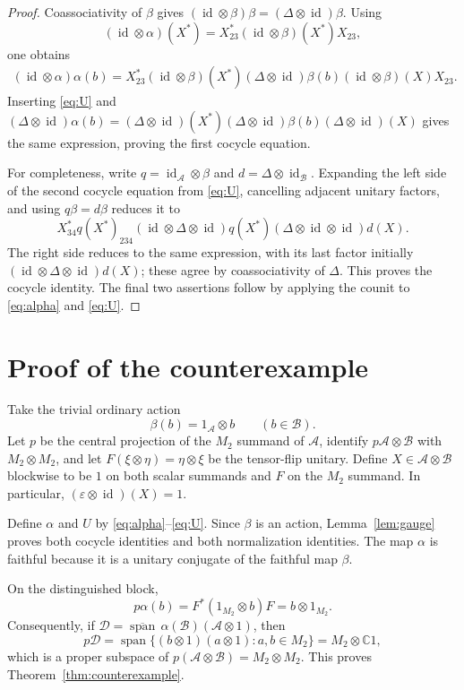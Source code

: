 \documentclass[11pt]{article}
\newcommand{\A}{\mathcal A}
\newcommand{\B}{\mathcal B}
\newcommand{\id}{\operatorname{id}}
\newcommand{\spn}{\operatorname{span}}
\begin{document}
\begin{proof}
Coassociativity of $\beta$ gives
$(\id\otimes\beta)\beta=(\Delta\otimes\id)\beta$.  Using
\[
 (\id\otimes\alpha)(X^*)
  =X_{23}^*(\id\otimes\beta)(X^*)X_{23},
\]
one obtains
\begin{align*}
 (\id\otimes\alpha)\alpha(b)
  =X_{23}^*(\id\otimes\beta)(X^*)
   (\Delta\otimes\id)\beta(b)
   (\id\otimes\beta)(X)X_{23}.
\end{align*}
Inserting \eqref{eq:U} and
$(\Delta\otimes\id)\alpha(b)
=(\Delta\otimes\id)(X^*)(\Delta\otimes\id)\beta(b)
(\Delta\otimes\id)(X)$ gives the same expression, proving the first
cocycle equation.

For completeness, write $q=\id_{\A}\otimes\beta$ and
$d=\Delta\otimes\id_{\B}$.  Expanding the left side of the second cocycle
equation from \eqref{eq:U}, cancelling adjacent unitary factors, and using
$q\beta=d\beta$ reduces it to
\[
 X_{34}^*q(X^*)_{234}
 (\id\otimes\Delta\otimes\id)q(X^*)
 (\Delta\otimes\id\otimes\id)d(X).
\]
The right side reduces to the same expression, with its last factor initially
$(\id\otimes\Delta\otimes\id)d(X)$; these agree by coassociativity of
$\Delta$.  This proves the cocycle identity.  The final two assertions follow
by applying the counit to \eqref{eq:alpha} and \eqref{eq:U}.
\end{proof}

\section{Proof of the counterexample}

Take the trivial ordinary action
\[
 \beta(b)=1_{\A}\otimes b \qquad(b\in\B).
\]
Let $p$ be the central projection of the $M_2$ summand of $\A$, identify
$p\A\otimes\B$ with $M_2\otimes M_2$, and let
$F(\xi\otimes\eta)=\eta\otimes\xi$ be the tensor-flip unitary.  Define
$X\in\A\otimes\B$ blockwise to be $1$ on both scalar summands and $F$ on
the $M_2$ summand.  In particular,
$(\varepsilon\otimes\id)(X)=1$.

Define $\alpha$ and $U$ by \eqref{eq:alpha}--\eqref{eq:U}.  Since $\beta$
is an action, Lemma~\ref{lem:gauge} proves both cocycle identities and both
normalization identities.  The map $\alpha$ is faithful because it is a
unitary conjugate of the faithful map $\beta$.

On the distinguished block,
\[
 p\alpha(b)=F^*(1_{M_2}\otimes b)F=b\otimes1_{M_2}.
\]
Consequently, if
$\mathcal D=\overline{\spn}\,\alpha(\B)(\A\otimes1)$, then
\[
 p\mathcal D
 =\spn\{(b\otimes1)(a\otimes1):a,b\in M_2\}
 =M_2\otimes\mathbb C1,
\]
which is a proper subspace of
$p(\A\otimes\B)=M_2\otimes M_2$.  This proves
Theorem~\ref{thm:counterexample}.
\end{document}
